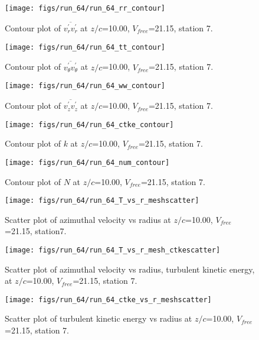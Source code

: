\begin{figure}[H]
\centering
\texttt{[image: figs/run\_64/run\_64\_rr\_contour]}
\caption{Contour plot of $\overline{v_{r}^{\prime} v_{r}^{\prime}}$ at $z/c$=10.00, $V_{free}$=21.15, station 7.}
\end{figure}


\begin{figure}[H]
\centering
\texttt{[image: figs/run\_64/run\_64\_tt\_contour]}
\caption{Contour plot of $\overline{v_{\theta}^{\prime} v_{\theta}^{\prime}}$ at $z/c$=10.00, $V_{free}$=21.15, station 7.}
\end{figure}


\begin{figure}[H]
\centering
\texttt{[image: figs/run\_64/run\_64\_ww\_contour]}
\caption{Contour plot of $\overline{v_{z}^{\prime} v_{z}^{\prime}}$ at $z/c$=10.00, $V_{free}$=21.15, station 7.}
\end{figure}


\begin{figure}[H]
\centering
\texttt{[image: figs/run\_64/run\_64\_ctke\_contour]}
\caption{Contour plot of $k$ at $z/c$=10.00, $V_{free}$=21.15, station 7.}
\end{figure}


\begin{figure}[H]
\centering
\texttt{[image: figs/run\_64/run\_64\_num\_contour]}
\caption{Contour plot of $N$ at $z/c$=10.00, $V_{free}$=21.15, station 7.}
\end{figure}


\begin{figure}[H]
\centering
\texttt{[image: figs/run\_64/run\_64\_T\_vs\_r\_meshscatter]}
\caption{Scatter plot of azimuthal velocity vs radius at $z/c$=10.00, $V_{free}$=21.15, station7.}
\end{figure}


\begin{figure}[H]
\centering
\texttt{[image: figs/run\_64/run\_64\_T\_vs\_r\_mesh\_ctkescatter]}
\caption{Scatter plot of azimuthal velocity vs radius, turbulent kinetic energy, at $z/c$=10.00, $V_{free}$=21.15, station 7.}
\end{figure}


\begin{figure}[H]
\centering
\texttt{[image: figs/run\_64/run\_64\_ctke\_vs\_r\_meshscatter]}
\caption{Scatter plot of turbulent kinetic energy vs radius at $z/c$=10.00, $V_{free}$=21.15, station 7.}
\end{figure}


